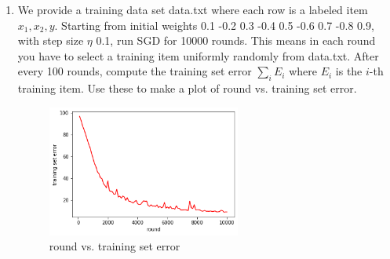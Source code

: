 \documentclass[a4paper]{article}
\theoremstyle{definition}
\newenvironment{soln}{
    \leavevmode\color{blue}\ignorespaces
}{}
\begin{document}
\begin{enumerate}
\begin{verbatim}
(weights) 1 0.9 0.8 0.7 0.6 0.5 0.4 0.3 0.2 (x) -0.2 1.7 (y) 0 (eta) 0.1
1.00000 0.90000 0.80000 0.70000 0.60000 0.50000 0.40000 0.30000 0.20000
0.31402
0.99609 0.90078 0.79335 0.69739 0.60052 0.49557 0.38697 0.27159 0.18136
0.29972

(weights) 4 3 2 1 0 -1 -2 -3 -4 (x) -4 1 (y) 0 (eta) 0.1
4.00000 3.00000 2.00000 1.00000 0.00000 -1.00000 -2.00000 -3.00000 -4.00000
0.00710
4.00000 3.00000 2.00000 1.00501 -0.02002 -0.99499 -2.00125 -3.00000 -4.00000
0.00371
\end{verbatim}
Print these for weights 0.1 -0.2 0.3 -0.4 0.5 -0.6 0.7 -0.8 0.9, input $x$ 1 -1, label $y$ 1, step size $\eta$ 0.1.

\begin{soln}

\begin{verbatim}
(weights) 0.1 -0.2 0.3 -0.4 0.5 -0.6 0.7 -0.8 0.9, (x) 1 -1 (y) 1 (eta) 0.1
0.10000 -0.20000 0.30000 -0.40000 0.50000 -0.60000 0.70000 -0.80000 0.90000
0.02187
0.10000 -0.20000 0.30000 -0.39689 0.50311 -0.60311 0.70346 -0.80000 0.90242
0.02141
\end{verbatim}
\end{soln}



\item
We provide a training data set data.txt where each row is a labeled item $x_1, x_2, y$.
Starting from initial weights 0.1 -0.2 0.3 -0.4 0.5 -0.6 0.7 -0.8 0.9, with step size $\eta$ 0.1,
run SGD for 10000 rounds.  This means in each round you have to select a training item uniformly randomly from data.txt.
After every 100 rounds, compute the training set error $\sum_i E_i$ where $E_i$ is the $i$-th training item.
Use these to make a plot of round vs. training set error.

\begin{figure}[h!]
	        \centering
	        \includegraphics[width=0.6\textwidth]{Q6.png} 
	        \captionsetup{labelformat=empty}
	        \caption{round vs. training set error}
	        \label{fig: round vs. training set error}
\end{figure}


\end{enumerate}
\end{document}
